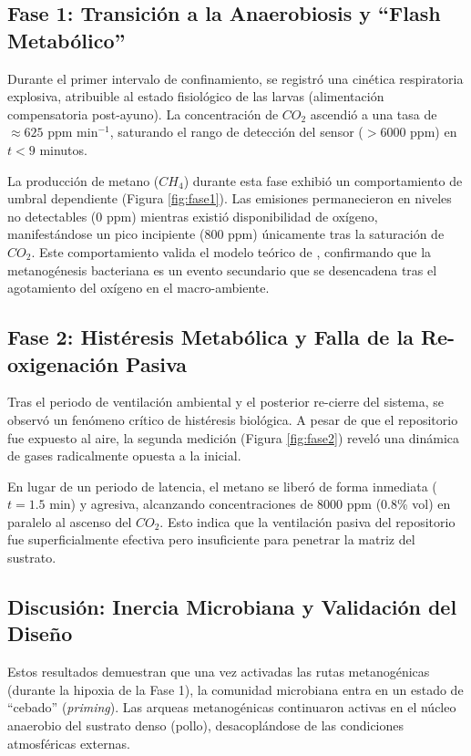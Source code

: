 \documentclass{article}
\begin{document}
\subsection{Fase 1: Transición a la Anaerobiosis y ``Flash Metabólico''}
Durante el primer intervalo de confinamiento, se registró una cinética respiratoria explosiva, atribuible al estado fisiológico de las larvas (alimentación compensatoria post-ayuno). La concentración de $CO_{2}$ ascendió a una tasa de $\approx 625 \text{ ppm min}^{-1}$, saturando el rango de detección del sensor ($>6000$ ppm) en $t < 9$ minutos.

La producción de metano ($CH_{4}$) durante esta fase exhibió un comportamiento de umbral dependiente (Figura \ref{fig:fase1}). Las emisiones permanecieron en niveles no detectables (0 ppm) mientras existió disponibilidad de oxígeno, manifestándose un pico incipiente (800 ppm) únicamente tras la saturación de $CO_{2}$. Este comportamiento valida el modelo teórico de \cite{ahlamineMathematicalAnalysisAnaerobic2024}, confirmando que la metanogénesis bacteriana es un evento secundario que se desencadena tras el agotamiento del oxígeno en el macro-ambiente.

\subsection{Fase 2: Histéresis Metabólica y Falla de la Re-oxigenación Pasiva}
Tras el periodo de ventilación ambiental y el posterior re-cierre del sistema, se observó un fenómeno crítico de histéresis biológica. A pesar de que el repositorio fue expuesto al aire, la segunda medición (Figura \ref{fig:fase2}) reveló una dinámica de gases radicalmente opuesta a la inicial.

En lugar de un periodo de latencia, el metano se liberó de forma inmediata ($t=1.5$ min) y agresiva, alcanzando concentraciones de 8000 ppm (0.8\% vol) en paralelo al ascenso del $CO_{2}$. Esto indica que la ventilación pasiva del repositorio fue superficialmente efectiva pero insuficiente para penetrar la matriz del sustrato.

\subsection{Discusión: Inercia Microbiana y Validación del Diseño}
Estos resultados demuestran que una vez activadas las rutas metanogénicas (durante la hipoxia de la Fase 1), la comunidad microbiana entra en un estado de ``cebado'' (\textit{priming}). Las arqueas metanogénicas continuaron activas en el núcleo anaerobio del sustrato denso (pollo), desacoplándose de las condiciones atmosféricas externas.
\end{document}
